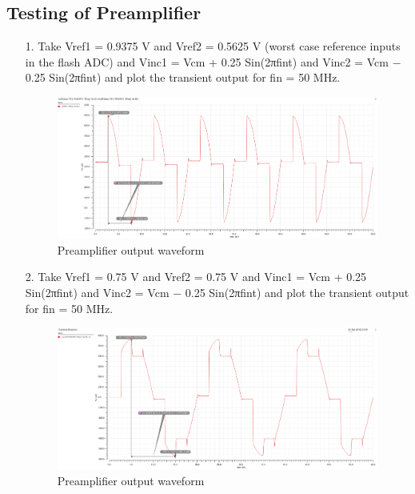 \documentclass[a4paper,12pt]{article}
\begin{document}
\subsection{Testing of Preamplifier}
\begin{itemize}
    \item[1.] Take Vref1 = 0.9375 V and Vref2 = 0.5625 V (worst case reference inputs in the flash ADC) and Vinc1 = Vcm + 0.25 Sin(2πfint) and Vinc2 = Vcm − 0.25 Sin(2πfint) and plot the transient output for fin = 50 MHz.

\begin{figure}[H]
    \centering
    \includegraphics[max width = \textwidth]{Flash_ADC_images/Preamp_out.png}
    \caption{Preamplifier output waveform}
    \label{fig:enter-label}
\end{figure}

    \item[2.] Take Vref1 = 0.75 V and Vref2 = 0.75 V and Vinc1 = Vcm + 0.25 Sin(2πfint) and Vinc2 = Vcm − 0.25 Sin(2πfint) and plot the transient output for fin = 50 MHz.
    \begin{figure}[H]
    \centering
    \includegraphics[max width = \textwidth]{Preamp_out_75ref.png}
    \caption{Preamplifier output waveform}
    \label{fig:enter-label}
\end{figure}


\end{itemize}
\end{document}
